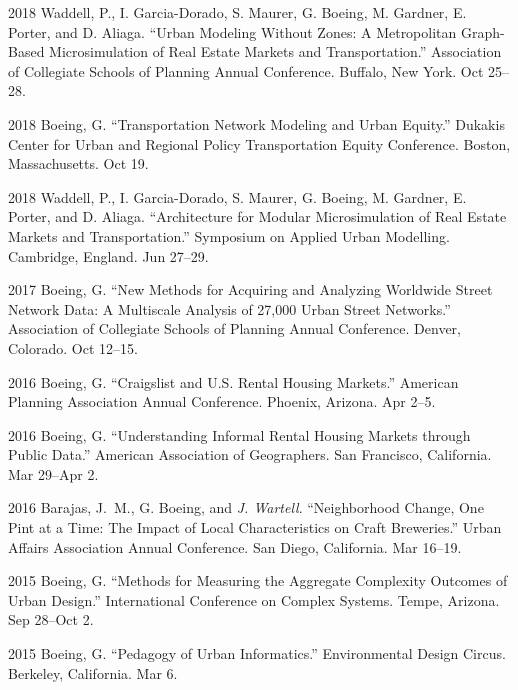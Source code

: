 \documentclass[12pt,letterpaper]{report}
\begin{document}
\begin{tablist}
        \item[2018] \tab Waddell, P., I. Garcia-Dorado, S. Maurer, G. Boeing, M. Gardner, E. Porter, and D. Aliaga. \enquote{Urban Modeling Without Zones: A Metropolitan Graph-Based Microsimulation of Real Estate Markets and Transportation.} Association of Collegiate Schools of Planning Annual Conference. Buffalo, New York. Oct 25--28.

        \item[2018] \tab Boeing, G. \enquote{Transportation Network Modeling and Urban Equity.} Dukakis Center for Urban and Regional Policy Transportation Equity Conference. Boston, Massachusetts. Oct 19.

        \item[2018] \tab Waddell, P., I. Garcia-Dorado, S. Maurer, G. Boeing, M. Gardner, E. Porter, and D. Aliaga. \enquote{Architecture for Modular Microsimulation of Real Estate Markets and Transportation.} Symposium on Applied Urban Modelling. Cambridge, England. Jun 27--29.

        \item[2017] \tab Boeing, G. \enquote{New Methods for Acquiring and Analyzing Worldwide Street Network Data: A Multiscale Analysis of 27,000 Urban Street Networks.} Association of Collegiate Schools of Planning Annual Conference. Denver, Colorado. Oct 12--15.

        \item[2016] \tab Boeing, G. \enquote{Craigslist and U.S. Rental Housing Markets.} American Planning Association Annual Conference. Phoenix, Arizona. Apr 2--5.

        \item[2016] \tab Boeing, G. \enquote{Understanding Informal Rental Housing Markets through Public Data.} American Association of Geographers. San Francisco, California. Mar 29--Apr 2.

        \item[2016] \tab Barajas, J.~M., G. Boeing, and \textit{J. Wartell}. \enquote{Neighborhood Change, One Pint at a Time: The Impact of Local Characteristics on Craft Breweries.} Urban Affairs Association Annual Conference. San Diego, California. Mar 16--19.

        \item[2015] \tab Boeing, G. \enquote{Methods for Measuring the Aggregate Complexity Outcomes of Urban Design.} International Conference on Complex Systems. Tempe, Arizona. Sep 28--Oct 2.

        \item[2015] \tab Boeing, G. \enquote{Pedagogy of Urban Informatics.} Environmental Design Circus. Berkeley, California. Mar 6.


\end{tablist}
\end{document}
